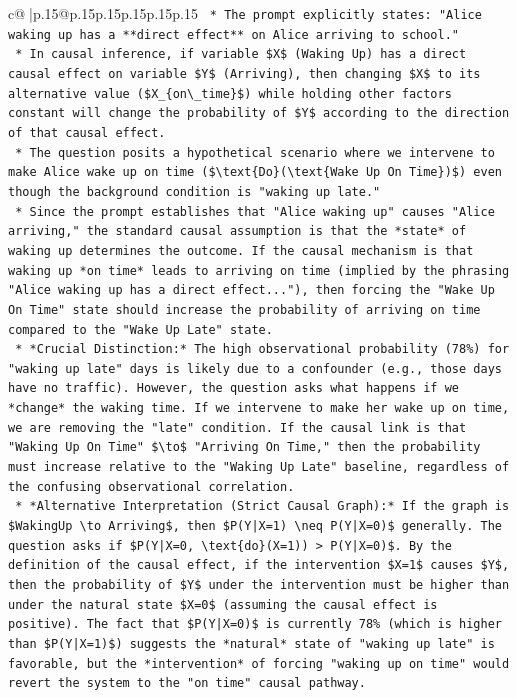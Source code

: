 \documentclass{article}
\begin{document}
{\begin{supertabular}{c@{$\;$}|p{.15\linewidth}@{}p{.15\linewidth}p{.15\linewidth}p{.15\linewidth}p{.15\linewidth}p{.15\linewidth}}
{{{\texttt{    *   The prompt explicitly states: "Alice waking up has a **direct effect** on Alice arriving to school."} \\
\texttt{    *   In causal inference, if variable \$X\$ (Waking Up) has a direct causal effect on variable \$Y\$ (Arriving), then changing \$X\$ to its alternative value (\$X\_\{on\textbackslash{}\_time\}\$) while holding other factors constant will change the probability of \$Y\$ according to the direction of that causal effect.} \\
\texttt{    *   The question posits a hypothetical scenario where we intervene to make Alice wake up on time (\$\textbackslash{}text\{Do\}(\textbackslash{}text\{Wake Up On Time\})\$) even though the background condition is "waking up late."} \\
\texttt{    *   Since the prompt establishes that "Alice waking up" causes "Alice arriving," the standard causal assumption is that the *state* of waking up determines the outcome. If the causal mechanism is that waking up *on time* leads to arriving on time (implied by the phrasing "Alice waking up has a direct effect..."), then forcing the "Wake Up On Time" state should increase the probability of arriving on time compared to the "Wake Up Late" state.} \\
\texttt{    *   *Crucial Distinction:* The high observational probability (78\%) for "waking up late" days is likely due to a confounder (e.g., those days have no traffic). However, the question asks what happens if we *change* the waking time. If we intervene to make her wake up on time, we are removing the "late" condition. If the causal link is that "Waking Up On Time" \$\textbackslash{}to\$ "Arriving On Time," then the probability must increase relative to the "Waking Up Late" baseline, regardless of the confusing observational correlation.} \\
\texttt{    *   *Alternative Interpretation (Strict Causal Graph):* If the graph is \$WakingUp \textbackslash{}to Arriving\$, then \$P(Y|X=1) \textbackslash{}neq P(Y|X=0)\$ generally. The question asks if \$P(Y|X=0, \textbackslash{}text\{do\}(X=1)) > P(Y|X=0)\$. By the definition of the causal effect, if the intervention \$X=1\$ causes \$Y\$, then the probability of \$Y\$ under the intervention must be higher than under the natural state \$X=0\$ (assuming the causal effect is positive). The fact that \$P(Y|X=0)\$ is currently 78\% (which is higher than \$P(Y|X=1)\$) suggests the *natural* state of "waking up late" is favorable, but the *intervention* of forcing "waking up on time" would revert the system to the "on time" causal pathway.} \\
}}}
\end{supertabular}}
\end{document}
